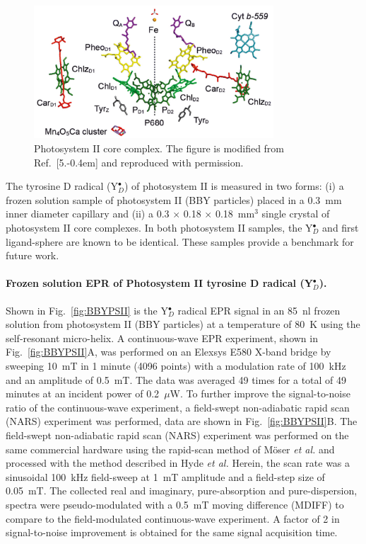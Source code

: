 \begin{figure}[htb]
\centering
\includegraphics[width=0.8\textwidth]{Kapitel/Ch5-Images/PSII_CORE.eps}
\caption[Photosystem II core complex.]{Photosystem II core complex. The figure is modified from Ref.~[5.\kern-0.4em] and reproduced with permission.}
\label{fig:psiicore}
\end{figure}

The tyrosine D radical (Y$_D^\bullet$) of photosystem II is measured in two forms: (i) a frozen solution sample of photosystem II (BBY particles) \cite{BBY1981} placed in a 0.3~mm inner diameter capillary and (ii) a 0.3 $\times$ 0.18 $\times$ 0.18~mm$^3$ single crystal of photosystem II core complexes. \cite{KERN2005147} In both photosystem II samples, the Y$_D^\bullet$ and first ligand-sphere are known to be identical. These samples provide a benchmark for future work.

\paragraph{Frozen solution EPR of Photosystem II tyrosine D radical (Y$_D^\bullet$).}
Shown in Fig.~\ref{fig:BBYPSII} is the Y$_D^\bullet$ radical EPR signal in an 85~nl frozen solution from photosystem II (BBY particles) at a temperature of 80~K using the self-resonant micro-helix. A continuous-wave EPR experiment, shown in Fig.~\ref{fig:BBYPSII}A, was performed on an Elexsys E580 X-band bridge by sweeping 10~mT in 1 minute (4096 points) with a modulation rate of 100~kHz and an amplitude of 0.5~mT. The data was averaged 49 times for a total of 49 minutes at an incident power of 0.2~$\mu$W. To further improve the signal-to-noise ratio of the continuous-wave experiment, a field-swept non-adiabatic rapid scan (NARS) experiment was performed, data are shown in Fig.~\ref{fig:BBYPSII}B. The field-swept non-adiabatic rapid scan (NARS) experiment was performed on the same commercial hardware using the rapid-scan method of M\"{o}ser {\em et al.}\cite{MOSER2017} and processed with the method described in Hyde {\em et al.}\cite{Hyde2013MDIFF} Herein, the scan rate was a sinusoidal 100~kHz field-sweep at 1~mT amplitude and a field-step size of 0.05~mT. The collected real and imaginary, pure-absorption and pure-dispersion, spectra were pseudo-modulated with a 0.5~mT moving difference (MDIFF)\cite{Hyde2013MDIFF} to compare to the field-modulated continuous-wave experiment. A factor of 2 in signal-to-noise improvement is obtained for the same signal acquisition time. 

